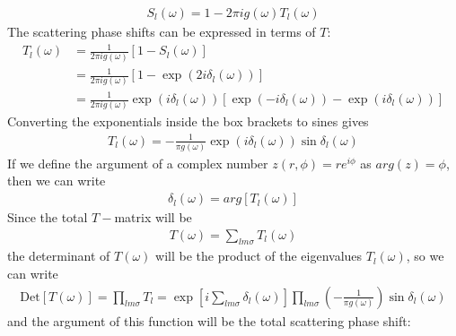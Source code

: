 \documentclass[12pt,twoside]{article}
\numberwithin{equation}{section}
\begin{document}
\begin{equation}\begin{aligned}
	\label{S_in_T}
	S_l(\omega) = 1 - 2 \pi i g(\omega) T_l(\omega)
\end{aligned}\end{equation}
The scattering phase shifts can be expressed in terms of \(T\):
\begin{equation}\begin{aligned}
	T_l(\omega) &= \frac{1}{2\pi i g(\omega)}\left[ 1 - S_l(\omega) \right]\\
		    &= \frac{1}{2\pi i g(\omega)}\left[1 - \exp\left( 2 i \delta_l(\omega) \right)\right]\\
		    &=\frac{1}{2\pi i g(\omega)}\exp\left(i \delta_l(\omega) \right)\left[\exp\left( - i \delta_l(\omega) \right) - \exp\left(i \delta_l(\omega) \right)\right]
\end{aligned}\end{equation}
Converting the exponentials inside the box brackets to sines gives
\begin{equation}\begin{aligned}
	\label{tmatphase}
	T_l(\omega) = -\frac{1}{\pi g(\omega)}\exp\left(i \delta_l(\omega) \right)\sin \delta_l(\omega)
\end{aligned}\end{equation}
If we define the argument of a complex number \(z(r,\phi) = r e^{i\phi}\) as \(arg(z) = \phi\), then we can write
\begin{equation}\begin{aligned}
	\delta_l(\omega) = arg\left[ T_l(\omega) \right] 
\end{aligned}\end{equation}
Since the total \(T-\)matrix will be 
\begin{equation}\begin{aligned}
	T(\omega) = \sum_{lm\sigma} T_l(\omega)
\end{aligned}\end{equation}
the determinant of \(T(\omega)\) will be the product of the eigenvalues \(T_l(\omega)\), so we can write
\begin{equation}\begin{aligned}
	\text{Det}\left[ T(\omega) \right] = \prod_{lm\sigma} T_l = \exp\left[ i\sum_{lm\sigma} \delta_l(\omega) \right] \prod_{lm\sigma}\left( -\frac{1}{\pi g(\omega)}\right)\sin \delta_l(\omega)
\end{aligned}\end{equation}
and the argument of this function will be the total scattering phase shift:
\end{document}
